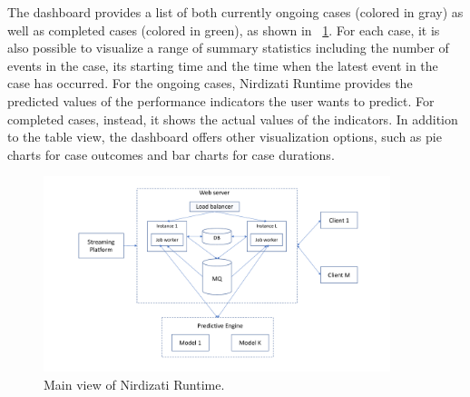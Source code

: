 \documentclass[runningheads,a4paper]{llncs}
\begin{document}
The dashboard provides a list of both currently ongoing cases (colored in gray) as well as completed cases (colored in green), as shown in \figurename~\ref{fig:nirdizati-runtime}. For each case, it is also possible to visualize a range of summary statistics including the number of events in the case, its starting time and the time when the latest event in the case has occurred. For the ongoing cases, Nirdizati Runtime provides the predicted values of the performance indicators the user wants to predict. For completed cases, instead, it shows the actual values of the indicators. In addition to the table view, the dashboard offers other visualization options, such as pie charts for case outcomes and bar charts for case durations.





\begin{figure}
	\centering
	\includegraphics[width=0.9\textwidth]{img/nirdizati-runtime}
	\caption{Main view of Nirdizati Runtime.}
	\label{fig:nirdizati-runtime}
	\vspace{-0.5\baselineskip}
\end{figure}
\end{document}
